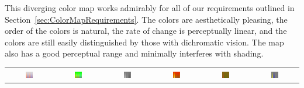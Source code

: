 \documentclass{llncs}
\begin{document}
This diverging color map works admirably for all of our
requirements outlined in
Section~\ref{sec:ColorMapRequirements}.  The colors are aesthetically
pleasing, the order of the colors is natural, the rate of change is
perceptually linear, and the colors are still easily distinguished by those
with dichromatic vision.  The map also has a good perceptual range and
minimally interferes with shading.

\begin{plate*}
  \centering
  \begin{tabular}{c@{\,}c@{\,}c@{\,}c@{\,}c@{\,}c}
    \includegraphics[width=0.16\textwidth]{images/Cool2WarmSpatialContrast} &
    \includegraphics[width=0.16\textwidth]{images/RainbowSpatialContrast} &
    \includegraphics[width=0.16\textwidth]{images/GrayscaleSpatialContrast} &
    \includegraphics[width=0.16\textwidth]{images/BlackBodySpatialContrast} &
    \includegraphics[width=0.16\textwidth]{images/Green2RedSpatialContrast} &
    \includegraphics[width=0.16\textwidth]{images/Blue2YellowSpatialContrast} \\


\end{tabular}
\end{plate*}
\end{document}
